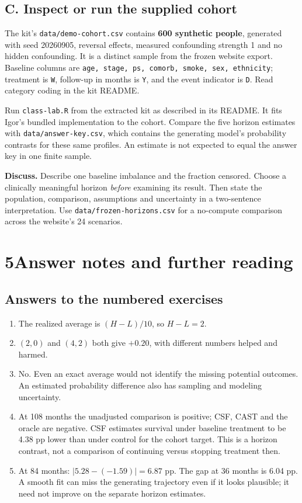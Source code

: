 \documentclass[11pt,letterpaper]{article}
\newcommand{\term}[1]{\textbf{\color{ink}#1}}
\begin{document}
\subsection{C. Inspect or run the supplied cohort}
The kit's \texttt{data/demo-cohort.csv} contains \term{600 synthetic people},
generated with seed 20260905, reversal effects, measured confounding strength
1 and no hidden confounding. It is a distinct sample from the frozen website
export. Baseline columns are \texttt{age, stage, ps, comorb, smoke, sex,
ethnicity}; treatment is \texttt{W}, follow-up in months is \texttt{Y}, and
the event indicator is \texttt{D}. Read category coding in the kit README.

Run \texttt{class-lab.R} from the extracted kit as described in its README.
It fits Igor's bundled implementation to the cohort. Compare the five horizon
estimates with \texttt{data/answer-key.csv}, which contains the generating
model's probability contrasts for these same profiles. An estimate is not
expected to equal the answer key in one finite sample.

\term{Discuss.} Describe one baseline imbalance and the fraction censored.
Choose a clinically meaningful horizon \emph{before} examining its result.
Then state the population, comparison, assumptions and uncertainty in a
two-sentence interpretation. Use \texttt{data/frozen-horizons.csv} for a
no-compute comparison across the website's 24 scenarios.

\newpage
\section{5\enspace Answer notes and further reading}
\subsection{Answers to the numbered exercises}
\begin{enumerate}
\item The realized average is $(H-L)/10$, so $H-L=2$.
\item $(2,0)$ and $(4,2)$ both give $+0.20$, with different numbers helped
and harmed.
\item No. Even an exact average would not identify the missing potential
outcomes. An estimated probability difference also has sampling and modeling
uncertainty.
\item At 108 months the unadjusted comparison is positive; CSF, CAST and the
oracle are negative. CSF estimates survival under baseline treatment to be
4.38 pp lower than under control for the cohort target. This is a horizon
contrast, not a comparison of continuing versus stopping treatment then.
\item At 84 months: $|5.28-(-1.59)|=6.87$ pp. The gap at 36 months is
6.04 pp. A smooth fit can miss the generating trajectory even if it looks
plausible; it need not improve on the separate horizon estimates.
\end{enumerate}
\end{document}
